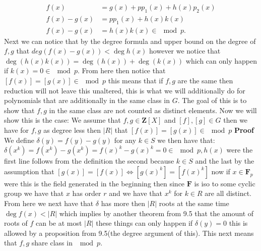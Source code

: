\documentclass[../Main.tex]{subfiles}
\begin{document}
\begin{enumerate}
\begin{equation}
    \begin{split}
        f(x)      &= g(x) + pp_1(x)+h(x)p_2(x)\\
        f(x)-g(x) &= pp_1(x)+h(x)k(x)\\
        f(x)-g(x) &= h(x)k(x) \in \mod{p}.
    \end{split}
\end{equation}
Next we can notice that by the degree formula and upper bound on the degree of $f,g$ that $deg(f(x)-g(x))<\deg h(x)$ however we notice that $\deg(h(x)k(x))=\deg(h(x))+\deg(k(x))$ which can only happen if $k(x)=0\in \mod{p}$. From here then notice that $[f(x)]=[g(x)]\in \mod{p}$ this means that if $f,g$ are the same then reduction will not leave this unaltered, this is what we will additionally do for polynomials that are additionally in the same class in $G$. The goal of this is to show that $f,g $ in the same class are not counted as distinct elements. Now we will show this is the case:
We assume that $f,g\in \mathbf{Z}[X]$ and $[f],[g]\in G$ then we have for $f,g$ as degree less then $|R|$ that $[f(x)]=[g(x)]\in \mod{p}$
\textbf{Proof} We define $\delta(y) = f(y)-g(y)$ for any $k\in S$ we then have that: $\delta(x^k)= f(x^k)-g(x^k)=f(x)^k-g(x)^k=0\in \mod{p,h(x)}$ were the first line follows from the definition the second because $k\in S$ and the last by the assumption that $[g(x)]=[f(x)]\iff [g(x)^k]=[f(x)^k] $ now if $x\in \mathbf{F}_p$ were this is the field generated in the beginning then since $\mathbf{F}$ is iso to some cyclic group we have that $x$ has order $r$ and we have that $x^k$ for $k\in R$ are all distinct. From here we next have that $\delta$ has more then $|R|$ roots at the same time $\deg{f(x)}<|R|$ which implies by another theorem from 9.5 that the amount of roots of $f$ can be at most $|R|$ these things can only happen if $\delta(y) = 0$ this is allowed by a proposition from 9.5(the degree argument of this). This next means that $f,g$ share class in $\mod{p}$.

\end{enumerate}
\end{document}
